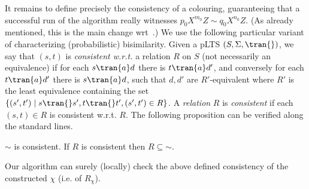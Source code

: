 It remains to define precisely the consistency of a colouring,
guaranteeing that a successful run of the algorithm really witnesses
$p_0X^{m_0}Z\sim q_0X^{n_0}Z$. (As already mentioned, this is the main
change wrt~\cite{BGJ:Concur10}.)
We use the following particular variant of
characterizing (probabilistic) bisimilarity.
Given a pLTS
$(S,\Sigma,\tran{})$,
we say that $(s,t)$ is \emph{consistent w.r.t.}
a relation $R$ on $S$ (not necessarily an equivalence)
if
for each $s\tran{a}d$ there is  $t\tran{a}d'$,
and conversely for each $t\tran{a}d'$ there is  $s\tran{a}d$,
such that $d, d'$ are $R'$-equivalent where
$R'$
is the least equivalence containing the set
$\{(s',t')\mid s\tran{}s', t\tran{}t', (s',t')\in R\}$.
A \emph{relation} $R$ is \emph{consistent} if each $(s,t)\in R$ is consistent w.r.t.
$R$. The following proposition can be verified along the standard
lines.


\begin{proposition}\label{prop:localconsistency}
$\sim$ is consistent.
If $R$ is consistent then $R\subseteq \mathord{\sim}$.
\end{proposition}
Our algorithm can surely (locally) check the above defined
consistency of the
constructed $\chi$
(i.e. of $R_{\chi}$).


